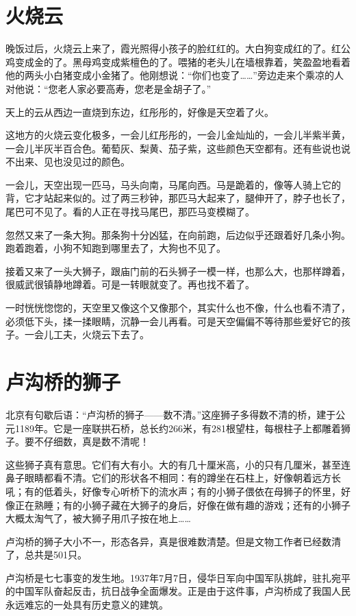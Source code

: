 \documentclass[12pt,UTF-8,openany]{ctexbook}
\begin{document}
\chapter{火烧云}

\begin{Large}
    
    晚饭过后，火烧云上来了，霞光照得小孩子的脸红红的。大白狗变成红的了。红公鸡变成金的了。黑母鸡变成紫檀色的了。喂猪的老头儿在墙根靠着，笑盈盈地看着他的两头小白猪变成小金猪了。他刚想说：“你们也变了……”旁边走来个乘凉的人对他说：“您老人家必要高寿，您老是金胡子了。”
    
    天上的云从西边一直烧到东边，红彤彤的，好像是天空着了火。
    
    这地方的火烧云变化极多，一会儿红彤彤的，一会儿金灿灿的，一会儿半紫半黄，一会儿半灰半百合色。葡萄灰、梨黄、茄子紫，这些颜色天空都有。还有些说也说不出来、见也没见过的颜色。
    
    一会儿，天空出现一匹马，马头向南，马尾向西。马是跪着的，像等人骑上它的背，它才站起来似的。过了两三秒钟，那匹马大起来了，腿伸开了，脖子也长了，尾巴可不见了。看的人正在寻找马尾巴，那匹马变模糊了。
    
    忽然又来了一条大狗。那条狗十分凶猛，在向前跑，后边似乎还跟着好几条小狗。跑着跑着，小狗不知跑到哪里去了，大狗也不见了。
    
    接着又来了一头大狮子，跟庙门前的石头狮子一模一样，也那么大，也那样蹲着，很威武很镇静地蹲着。可是一转眼就变了。再也找不着了。
    
    一时恍恍惚惚的，天空里又像这个又像那个，其实什么也不像，什么也看不清了，必须低下头，揉一揉眼睛，沉静一会儿再看。可是天空偏偏不等待那些爱好它的孩子。一会儿工夫，火烧云下去了。
    
\end{Large}

\chapter{卢沟桥的狮子}

\begin{Large}
    
    北京有句歇后语：“卢沟桥的狮子——数不清。”这座狮子多得数不清的桥，建于公元1189年。它是一座联拱石桥，总长约266米，有281根望柱，每根柱子上都雕着狮子。要不仔细数，真是数不清呢！
    
    这些狮子真有意思。它们有大有小。大的有几十厘米高，小的只有几厘米，甚至连鼻子眼睛都看不清。它们的形状各不相同：有的蹲坐在石柱上，好像朝着远方长吼；有的低着头，好像专心听桥下的流水声；有的小狮子偎依在母狮子的怀里，好像正在熟睡；有的小狮子藏在大狮子的身后，好像在做有趣的游戏；还有的小狮子大概太淘气了，被大狮子用爪子按在地上……
    
    卢沟桥的狮子大小不一，形态各异，真是很难数清楚。但是文物工作者已经数清了，总共是501只。
    
    卢沟桥是七七事变的发生地。1937年7月7日，侵华日军向中国军队挑衅，驻扎宛平的中国军队奋起反击，抗日战争全面爆发。正是由于这件事，卢沟桥成了我国人民永远难忘的一处具有历史意义的建筑。
    
\end{Large}
\end{document}
